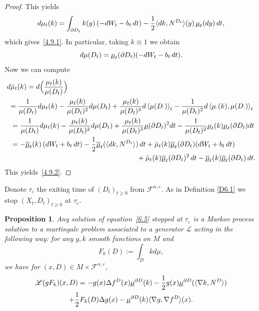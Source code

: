 \documentclass[10pt]{amsart}
\theoremstyle{plain}
\newtheorem{prop}[thm]{Proposition}
\theoremstyle{definition}
\newcommand{\SL}{{\mathscr L}}
\newcommand{\lan}{\lt\langle}
\newcommand{\ran}{\rt\rangle}
\newcommand{\lt}{\left}
\newcommand{\rt}{\right}
\newcommand{\usm}{{\underline{\smash{\mu}}}}
\newcommand{\usbm}{{\underline{\smash{\overline\mu}}}}
\let\f\frac
\let\a\alpha
\let\e\varepsilon
\let\n\nabla
\newcommand{\cF}{\mathcal{F}}
\begin{document}
\begin{proof}
This yields
\begin{equation}
d\mu_t(k)=\int_{\partial D_t}{k}(y)\left(-dW_t-b_t\,dt\right)-\f12 \langle dk,N^{D_t}\rangle(y)\,\usm_{{t}}(dy)\,dt,
\end{equation}
which gives~\eqref{4.9.1}.
In particular, taking $k \equiv 1$ we obtain
\begin{equation}
\label{4.19}
d\mu(D_t)=\usm_t(\partial D_t)(-dW_t -b_t\,dt).
\end{equation}
Now we can compute
\begin{align*}
d&\bar\mu_t(k)=d\Bigl(\f{\mu_t(k)}{\mu(D_t)}\Bigr)\\
&{=\f1{\mu(D_t)}d\mu_t(k)-\f{\mu_t(k)}{\mu(D_t)^2}d\mu(D_t)+\f{\mu_t(k)}{\mu(D_t)^3}d\lan\mu(D_\cdot)\ran_t
-\f1{\mu(D_t)^2}d\lan \mu_\cdot(k),\mu(D_\cdot)\ran_t}\\
&=\f1{\mu(D_t)}d\mu_t(k)-\f{\mu_t(k)}{\mu(D_t)^2}d\mu(D_t)+\f{\mu_t(k)}{\mu(D_t)^3}\usm(\partial D_t)^2dt-\f{1}{\mu(D_t)^2}\usm_t(k)\usm_t(\partial D_t)dt\\
&=-\usbm_t(k)\left(dW_t+b_t\,dt\right)-\f12\usbm_t(\langle dk,N^{D_t}\rangle )\,dt+\bar\mu_t(k)\usbm_t(\partial D_t)(dW_t+b_t\,dt)\\
&\hspace*{6.3cm}+\bar\mu_t(k)\usbm_t(\partial D_t)^2\,dt
-\usbm_t(k)\usbm_t(\partial D_t)\,dt.
\end{align*}
This yields~\eqref{4.9.2}.
\end{proof}
\par
Denote $\tau_\e$ the exiting time of $(D_t)_{t\geq 0}$ from $\cF^{\a,\e}$.
As in Definition \ref{D6.1} we stop $(X_t,D_t)_{t\geq 0}$ at $\tau_\e$.
\begin{prop}
\label{P6.1}
Any solution of equation~\eqref{6.5} stopped at $\tau_\e$ is a Markov process solution to a martingale problem associated to a generator $\SL$ acting in the following way: for any $g,k$ smooth functions on $M$ and
\begin{equation}
F_k (D):=\int_Dkd\mu,
\end{equation}
we have for $(x,D)\in M\times\cF^{\a,\e}$,
\begin{multline}
\label{6.14}
\SL(gF_k)(x,D)=-g(x)\Delta f^D(x)\usm^{\partial D}(k)-\f12 g(x)\usm^{\partial D}(\langle \n k, N^D\rangle)\\
+\f12 F_k(D)\Delta g(x)-\usm^{\partial D}(k)\langle\n g, \n f^D\rangle (x).
\end{multline}
\end{prop}
\end{document}
